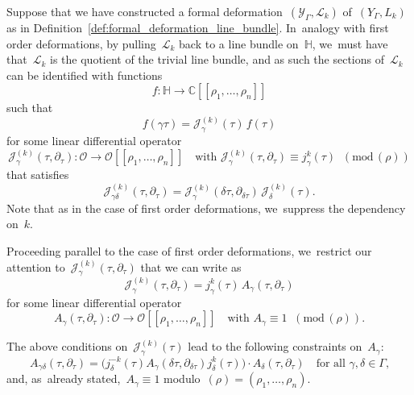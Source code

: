 \documentclass[10pt,a4paper]{article}
\numberwithin{equation}{section}
\theoremstyle{plain}
\theoremstyle{definition}
\newcommand{\tx}{\text}
\newcommand{\bbC}{\ensuremath{\mathbb{C}}}
\newcommand{\cJ}{\ensuremath{\mathcal{J}}}
\newcommand{\cL}{\ensuremath{\mathcal{L}}}
\newcommand{\cO}{\ensuremath{\mathcal{O}}}
\newcommand{\cY}{\ensuremath{\mathcal{Y}}}
\newcommand{\defcol}{\mathrel{:}}
\newcommand{\llbrkt}{[\![}
\newcommand{\rrbrkt}{]\!]}
\renewcommand{\pmod}[1]{\;(\mathrm{mod}\, #1)}
\newcommand{\HS}{\ensuremath{\mathbb{H}}}
\let\Ga\Gamma
\let\ga\gamma
\begin{document}
Suppose that we have constructed a formal deformation~$(\cY_\Ga,\cL_k)$ of~$(Y_\Ga,L_k)$ as in Definition~\ref{def:formal_deformation_line_bundle}. In~analogy with first order deformations, by pulling~$\cL_k$ back to a line bundle on~$\HS$, we~must have that~$\cL_k$ is the quotient of the trivial line bundle, and as such the sections of~$\cL_k$ can be identified with functions
\begin{equation*}
f \defcol \HS \to \bbC \llbrkt \rho_1,\ldots,\rho_n\rrbrkt
\end{equation*}
such that
\begin{equation*}
f(\ga\tau) = \cJ^{(k)}_\ga(\tau)\, f(\tau)
\end{equation*}
for some linear differential operator
\begin{equation*}
\cJ^{(k)}_\ga(\tau, \partial_\tau) \defcol \cO \to \cO\llbrkt \rho_1,\ldots,\rho_n\rrbrkt
\quad
\tx{with\ }
\cJ^{(k)}_\ga(\tau, \partial_\tau)
\equiv
j_\ga^k(\tau)
\;\pmod{(\rho)}
\end{equation*}
that satisfies
\begin{equation*}
\cJ^{(k)}_{\ga\delta}(\tau, \partial_\tau)
=
\cJ^{(k)}_\ga(\delta\tau, \partial_{\delta\tau})\, \cJ^{(k)}_\delta(\tau)
\tx{.}
\end{equation*}
Note that as in the case of first order deformations, we~suppress the dependency on~$k$.

Proceeding parallel to the case of first order deformations, we~restrict our attention to~$\cJ^{(k)}_\ga(\tau, \partial_\tau)$ that we can write as
\begin{equation*}
\cJ^{(k)}_\ga(\tau, \partial_\tau)
=
j_\ga^k(\tau)\,
A_\ga(\tau, \partial_\tau)
\end{equation*}
for some linear differential operator
\begin{equation*}
A_\ga(\tau, \partial_\tau) \defcol \cO \to \cO\llbrkt \rho_1,\ldots,\rho_n\rrbrkt
\quad
\tx{with\ }
A_\ga
\equiv
1
\;\pmod{(\rho)}
\tx{.}
\end{equation*}

The above conditions on~$\cJ^{(k)}_\ga(\tau)$ lead to the following constraints on~$A_\ga$:
\begin{equation}
\label{eq:formal_deformation_cocycle_line_bundle_relation}
A_{\ga\delta}(\tau, \partial_\tau)
=
\bigl(j_\delta^{-k}(\tau) A_\ga(\delta\tau, \partial_{\delta\tau}) j_\delta^k(\tau) \bigr)
\cdot
A_\delta(\tau, \partial_\tau)
\quad
\tx{for all\ }\ga, \delta \in \Ga\tx{,}
\end{equation}
and, as~already stated,~$A_\ga \equiv 1$ modulo~$(\rho) = (\rho_1,\ldots,\rho_n)$.
\end{document}
